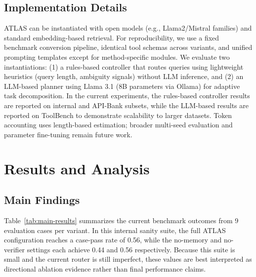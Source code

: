 \documentclass[conference]{IEEEtran}
\begin{document}
\subsection{Implementation Details}

ATLAS can be instantiated with open models (e.g., Llama2/Mistral families) and standard embedding-based retrieval. For reproducibility, we use a fixed benchmark conversion pipeline, identical tool schemas across variants, and unified prompting templates except for method-specific modules. We evaluate two instantiations: (1) a rules-based controller that routes queries using lightweight heuristics (query length, ambiguity signals) without LLM inference, and (2) an LLM-based planner using Llama 3.1 (8B parameters via Ollama) for adaptive task decomposition. In the current experiments, the rules-based controller results are reported on internal and API-Bank subsets, while the LLM-based results are reported on ToolBench to demonstrate scalability to larger datasets. Token accounting uses length-based estimation; broader multi-seed evaluation and parameter fine-tuning remain future work.

\section{Results and Analysis}

\subsection{Main Findings}

Table~\ref{tab:main-results} summarizes the current benchmark outcomes from 9 evaluation cases per variant. In this internal sanity suite, the full ATLAS configuration reaches a case-pass rate of 0.56, while the no-memory and no-verifier settings each achieve 0.44 and 0.56 respectively. Because this suite is small and the current router is still imperfect, these values are best interpreted as directional ablation evidence rather than final performance claims.

\begin{table}[htbp]
\caption{Baseline proxy comparison on the internal 9-case suite.}
\centering
{}
\label{tab:baseline-proxy}
\end{table}
\end{document}
